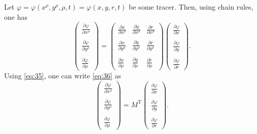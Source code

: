 \documentclass[12pt]{report}
\def\p{\partial}
\begin{document}
Let $\varphi = \varphi(x^\rho, y^\rho, \rho,t) = \varphi(x,y,r,t)$ be
some tracer. Then, using chain rules, one has
\begin{equation}
\label{eq:36}
  \left(\begin{matrix}\frac{\p\varphi}{\p x^\rho}\\ \\
      \frac{\p\varphi}{\p y^\rho} \\ \\ \frac{\p\varphi}{\p
        \rho} \end{matrix}\right)= 
  \left(\begin{matrix}\frac{\p x}{\p x^\rho} & \frac{\p y}{\p x^\rho} &
      \frac{\p r}{\p x^\rho} \\ \\
\frac{\p x}{\p y^\rho} & \frac{\p y}{\p y^\rho} &
     \frac{\p r}{\p y^\rho} \\ \\
\frac{\p x}{\p \rho} & \frac{\p y}{\p\rho} &
    \frac{\p r}{\p\rho} 
\end{matrix}\right)  
  \left(\begin{matrix}\frac{\p\varphi}{\p x}\\ \\
      \frac{\p\varphi}{\p y} \\ \\ \frac{\p\varphi}{\p
        r} \end{matrix}\right).
\end{equation}
Using \eqref{eq:35}, one can write \eqref{eq:36} as
\begin{equation}
\label{eq:37}
  \left(\begin{matrix}\frac{\p\varphi}{\p x^\rho}\\ \\
      \frac{\p\varphi}{\p y^\rho} \\ \\ \frac{\p\varphi}{\p
        \rho} \end{matrix}\right)= 
  M^\textrm{T}
  \left(\begin{matrix}\frac{\p\varphi}{\p x}\\ \\
      \frac{\p\varphi}{\p y} \\ \\ \frac{\p\varphi}{\p
        r} \end{matrix}\right).
\end{equation}
\end{document}
